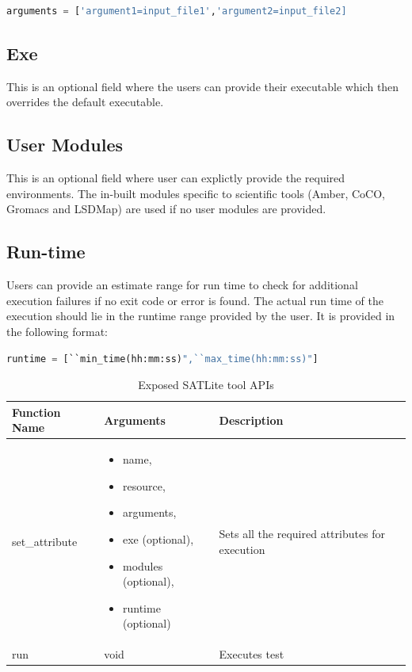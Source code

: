 \documentclass[10pt]{ruthesis}
\begin{document}
\begin{lstlisting}[language=Python,linewidth=13cm]
 arguments = ['argument1=input_file1','argument2=input_file2]
\end{lstlisting}

\subsection{Exe}
This is an optional field where the users can provide their executable which then overrides the default executable.

\subsection{User Modules}
This is an optional field where user can explictly provide the required environments. The in-built modules specific to scientific tools (Amber, CoCO, Gromacs and LSDMap) are used if no user modules are provided.

\subsection{Run-time}
Users can provide an estimate range for run time to check for additional execution failures if no exit code or error is found. The actual run time of the execution should lie in the runtime range provided by the user. It is provided in the following format:

\begin{lstlisting}[language=Python,linewidth=12cm]
 runtime = [``min_time(hh:mm:ss)",``max_time(hh:mm:ss)"]
\end{lstlisting}

\begin{table}
\begin{center}
\def\arraystretch{1.5}
\begin{tabular}{|p{4cm}|p{5cm}|p{6cm}|}
\hline
\rule{0pt}{15pt} \textbf{Function Name} & \textbf{Arguments} & \textbf{Description} \\[2ex]
\hline
set\_attribute &
	\begin{itemize}
	\item name,
	\item resource,
	\item arguments,
	\item exe (optional),
	\item modules (optional),
	\item runtime (optional)
	\end{itemize} &
Sets all the required attributes for execution
\\
\hline
run &
void &
Executes test
\\
\hline
\end{tabular}
\end{center}
\caption{Exposed SATLite tool APIs}
\label{satapi}
\end{table}
\end{document}
